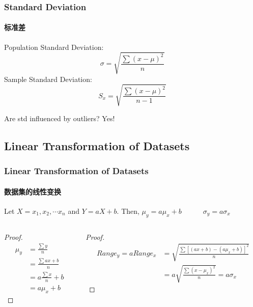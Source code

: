 \documentclass[
	11pt, %
]{beamer}
\begin{document}

\begin{frame}
	\frametitle{Standard Deviation}
	\framesubtitle{标准差}
	\begin{definition}
	Population Standard Deviation:
		\begin{equation*}
			\sigma = \sqrt{\frac{\sum (x - \mu)^2}{n}}
		\end{equation*}
			Sample Standard Deviation:
		\begin{equation*}
			S_x = \sqrt{\frac{\sum (x - \mu)^2}{n-1}}
		\end{equation*}
	\end{definition}
	\pause
	\alert{Are std influenced by outliers?} \pause Yes!
\end{frame}

\subsection{Linear Transformation of Datasets}

\begin{frame}
	\frametitle{Linear Transformation of Datasets}
	\framesubtitle{数据集的线性变换}
	\begin{theorem}
		Let $X = {x_1, x_2, \cdots x_n}$ and $Y = aX + b$. Then,
		$\mu_y = a\mu_x + b \quad \quad \quad\sigma_y = a\sigma_x$
	\end{theorem}
	\begin{columns}[t] 
		\begin{column}{0.45\textwidth} %
		\begin{proof}
		\begin{equation*}
			\begin{aligned}
				\mu_y &= \frac{\sum y}{n}\\
				      &= \frac{\sum ax + b}{n}\\
				      &= a \frac{\sum x}{n} + b\\
				      &= a \mu_x + b
			\end{aligned}
		\end{equation*}
		\end{proof}

		\end{column}
		\begin{column}{0.5\textwidth} %
				\begin{proof}
				\begin{equation*}
					\begin{aligned}
						Range_y = a Range_x  &= \sqrt{\frac{\sum [(ax + b) - (a\mu_x + b)]^2}{n}}\\
						         &= a\sqrt{\frac{\sum (x  - \mu_x )^2}{n}}= a \sigma_x
					\end{aligned}
				\end{equation*}
				\end{proof}
		\end{column}
	\end{columns}
\end{frame}
\end{document}
